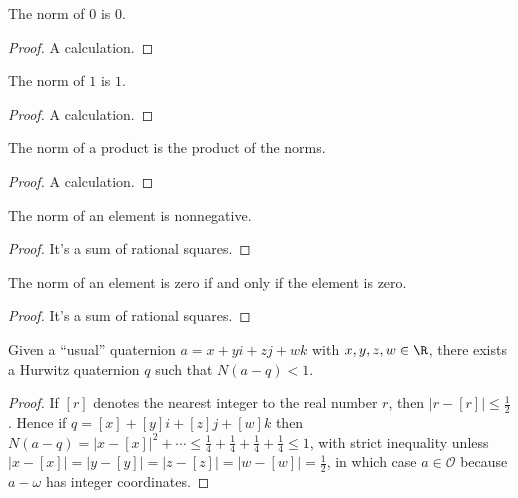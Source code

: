 \begin{lemma}
    \label{Hurwitz.norm_zero}
    \leanok
    The norm of $0$ is $0$.
\end{lemma}
\begin{proof}
    \leanok
    A calculation.
\end{proof}

\begin{lemma}
    \label{Hurwitz.norm_one}
    \leanok
    The norm of $1$ is $1$.
\end{lemma}
\begin{proof}
    \leanok
    A calculation.
\end{proof}

\begin{lemma}
    \label{Hurwitz.norm_mul}
    \leanok
    The norm of a product is the product of the norms.
\end{lemma}
\begin{proof}
    \leanok
    A calculation.
\end{proof}

\begin{lemma}
    \label{Hurwitz.norm_nonneg}
    \leanok
    The norm of an element is nonnegative.
\end{lemma}
\begin{proof} \leanok
    It's a sum of rational squares.
\end{proof}

\begin{lemma}
    \label{Hurwitz.norm_eq_zero}
    \leanok
    The norm of an element is zero if and only if the element is zero.
\end{lemma}
\begin{proof}
    \leanok
    It's a sum of rational squares.
\end{proof}

\begin{lemma}
    \label{Hurwitz.exists_near}
    \leanok
    Given a ``usual'' quaternion $a=x+yi+zj+wk$ with $x,y,z,w\in\R$,
    there exists a Hurwitz quaternion $q$ such that $N(a-q)<1$.
\end{lemma}
\begin{proof}
    \leanok
  If $[r]$ denotes the nearest integer to the real number $r$, then $|r-[r]|\leq \frac{1}{2}$.
  Hence if $q=[x]+[y]i+[z]j+[w]k$ then $N(a-q)=|x-[x]|^2+\cdots
  \leq \frac{1}{4}+\frac{1}{4}+\frac{1}{4}+\frac{1}{4}\leq 1$, with strict inequality unless
  $|x-[x]|=|y-[y]|=|z-[z]|=|w-[w]|=\frac{1}{2}$, in which case $a\in\mathcal{O}$ because $a-\omega$
  has integer coordinates.
\end{proof}

